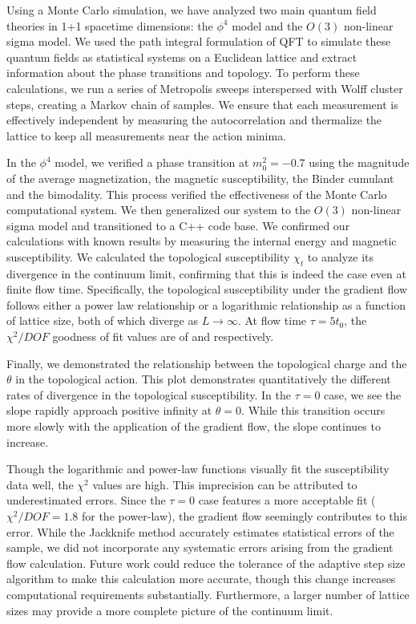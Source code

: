 Using a Monte Carlo simulation, we have analyzed two main quantum field theories in 1+1 spacetime dimensions: the $\phi^4$ model and the $O(3)$ non-linear sigma model. We used the path integral formulation of QFT to simulate these quantum fields as statistical systems on a Euclidean lattice and extract information about the phase transitions and topology. To perform these calculations, we run a series of Metropolis sweeps interspersed with Wolff cluster steps, creating a Markov chain of samples. We ensure that each measurement is effectively independent by measuring the autocorrelation and thermalize the lattice to keep all measurements near the action minima.

In the $\phi^4$ model, we verified a phase transition at $m_0^2=-0.7$ using the magnitude of the average magnetization, the magnetic susceptibility, the Binder cumulant and the bimodality. This process verified the effectiveness of the Monte Carlo computational system. We then generalized our system to the $O(3)$ non-linear sigma model and transitioned to a C++ code base. We confirmed our calculations with known results by measuring the internal energy and magnetic susceptibility. We calculated the topological susceptibility $\chi_t$ to analyze its divergence in the continuum limit, confirming that this is indeed the case even at finite flow time. Specifically, the topological susceptibility under the gradient flow follows either a power law relationship or a logarithmic relationship as a function of lattice size, both of which diverge as $L\rightarrow\infty$.  At flow time $\tau=5t_0$, the $\chi^2/DOF$ goodness of fit values are of \powchi and \logchi respectively. 

Finally, we demonstrated the relationship between the topological charge and the $\theta$ in the topological action. This plot demonstrates quantitatively the different rates of divergence in the topological susceptibility. In the $\tau=0$ case, we see the slope rapidly approach positive infinity at $\theta=0$. While this transition occurs more slowly with the application of the gradient flow, the slope continues to increase.

Though the logarithmic and power-law functions visually fit the susceptibility data well, the $\chi^2$ values are high. This imprecision can be attributed to underestimated errors. Since the $\tau=0$ case features a more acceptable fit ($\chi^2/DOF=1.8$ for the power-law), the gradient flow seemingly contributes to this error. While the Jackknife method accurately estimates statistical errors of the sample, we did not incorporate any systematic errors arising from the gradient flow calculation. Future work could reduce the tolerance of the adaptive step size algorithm to make this calculation more accurate, though this change increases computational requirements substantially. Furthermore, a larger number of lattice sizes may provide a more complete picture of the continuum limit.

